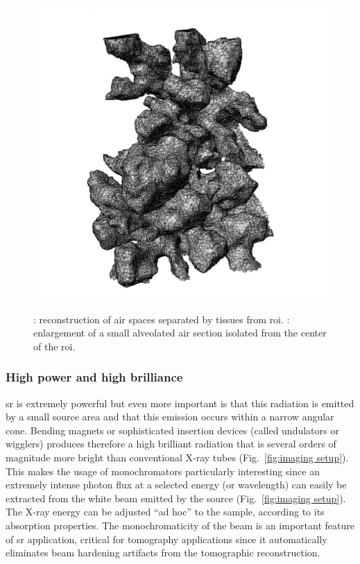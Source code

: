 \begin{figure}[h]
{		\includegraphics[width=\imsize]{img/Tsuda2008/Tsuda-09b}%
		\label{subfig:tsuda-09b}%
	}%
	\caption[Three-dimensional reconstruction of air spaces]{: reconstruction of \threed air spaces separated by tissues from \ac{roi}. : enlargement of a small alveolated air section isolated from the center of the \ac{roi}.}
	\label{fig:tsuda-09}
\end{figure}

\subsubsection{High power and high brilliance}
\ac{sr} is extremely powerful but even more important is that this radiation is emitted by a small source area and that this emission occurs within a narrow angular cone. Bending magnets or sophisticated insertion devices (called undulators or wigglers) produces therefore a high brilliant radiation that is several orders of magnitude more bright than conventional X-ray tubes (Fig.~\ref{fig:imaging setup}). This makes the usage of monochromators particularly interesting since an extremely intense photon flux at a selected energy (or wavelength) can easily be extracted from the white beam emitted by the source (Fig.~\ref{fig:imaging setup}). The X-ray energy can be adjusted ``ad hoc'' to the sample, according to its absorption properties. The monochromaticity of the beam is an important feature of \ac{sr} application, critical for tomography applications since it automatically eliminates beam hardening artifacts from the tomographic reconstruction.

